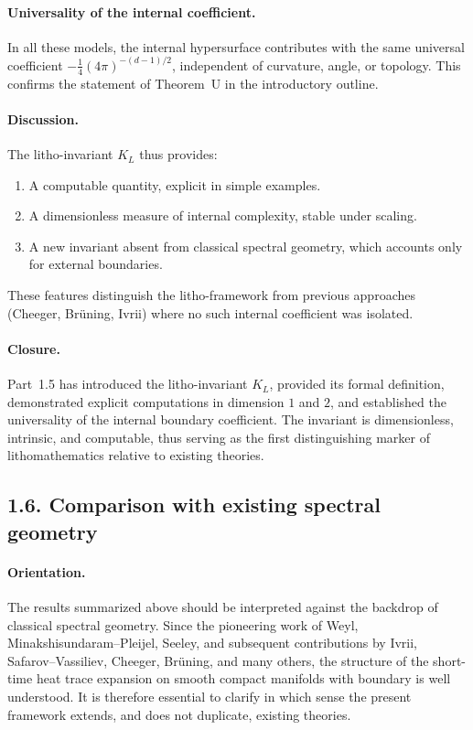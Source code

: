 \paragraph{Universality of the internal coefficient.}
In all these models, the internal hypersurface contributes
with the same universal coefficient $-\tfrac14(4\pi)^{-(d-1)/2}$,
independent of curvature, angle, or topology. This confirms
the statement of Theorem~U in the introductory outline.

\paragraph{Discussion.}
The litho-invariant $K_L$ thus provides:
\begin{enumerate}
\item A computable quantity, explicit in simple examples.
\item A dimensionless measure of internal complexity, stable under scaling.
\item A new invariant absent from classical spectral geometry,
which accounts only for external boundaries.
\end{enumerate}
These features distinguish the litho-framework from previous
approaches (Cheeger, Brüning, Ivrii) where no such internal
coefficient was isolated.

\paragraph{Closure.}
Part~1.5 has introduced the litho-invariant $K_L$, provided its formal definition,
demonstrated explicit computations in dimension $1$ and $2$, and established
the universality of the internal boundary coefficient. The invariant is
dimensionless, intrinsic, and computable, thus serving as the first
distinguishing marker of lithomathematics relative to existing theories.

\subsection*{1.6. Comparison with existing spectral geometry}

\paragraph{Orientation.}
The results summarized above should be interpreted against the backdrop of
classical spectral geometry. Since the pioneering work of Weyl, Minakshisundaram–Pleijel,
Seeley, and subsequent contributions by Ivrii, Safarov–Vassiliev, Cheeger, Brüning,
and many others, the structure of the short-time heat trace expansion
on smooth compact manifolds with boundary is well understood.
It is therefore essential to clarify in which sense the present framework
extends, and does not duplicate, existing theories.

